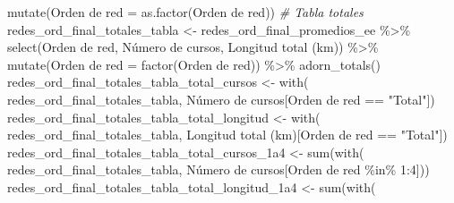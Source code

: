 \documentclass[spanish]{article}
\newenvironment{Shaded}{\begin{snugshade}}{\end{snugshade}}
\newcommand{\AttributeTok}[1]{\textcolor[rgb]{0.77,0.63,0.00}{#1}}
\newcommand{\CommentTok}[1]{\textcolor[rgb]{0.56,0.35,0.01}{\textit{#1}}}
\newcommand{\DecValTok}[1]{\textcolor[rgb]{0.00,0.00,0.81}{#1}}
\newcommand{\FunctionTok}[1]{\textcolor[rgb]{0.00,0.00,0.00}{#1}}
\newcommand{\NormalTok}[1]{#1}
\newcommand{\OtherTok}[1]{\textcolor[rgb]{0.56,0.35,0.01}{#1}}
\newcommand{\SpecialCharTok}[1]{\textcolor[rgb]{0.00,0.00,0.00}{#1}}
\newcommand{\StringTok}[1]{\textcolor[rgb]{0.31,0.60,0.02}{#1}}
\begin{document}
\begin{Shaded}
\begin{Highlighting}[]
  \FunctionTok{mutate}\NormalTok{(}\StringTok{\textasciigrave{}}\AttributeTok{Orden de red}\StringTok{\textasciigrave{}} \OtherTok{=} \FunctionTok{as.factor}\NormalTok{(}\StringTok{\textasciigrave{}}\AttributeTok{Orden de red}\StringTok{\textasciigrave{}}\NormalTok{))}
\CommentTok{\# Tabla totales}
\NormalTok{redes\_ord\_final\_totales\_tabla }\OtherTok{\textless{}{-}}\NormalTok{ redes\_ord\_final\_promedios\_ee }\SpecialCharTok{\%\textgreater{}\%} 
  \FunctionTok{select}\NormalTok{(}\StringTok{\textasciigrave{}}\AttributeTok{Orden de red}\StringTok{\textasciigrave{}}\NormalTok{, }\StringTok{\textasciigrave{}}\AttributeTok{Número de cursos}\StringTok{\textasciigrave{}}\NormalTok{,}
         \StringTok{\textasciigrave{}}\AttributeTok{Longitud total (km)}\StringTok{\textasciigrave{}}\NormalTok{) }\SpecialCharTok{\%\textgreater{}\%} 
  \FunctionTok{mutate}\NormalTok{(}\StringTok{\textasciigrave{}}\AttributeTok{Orden de red}\StringTok{\textasciigrave{}} \OtherTok{=} \FunctionTok{factor}\NormalTok{(}\StringTok{\textasciigrave{}}\AttributeTok{Orden de red}\StringTok{\textasciigrave{}}\NormalTok{)) }\SpecialCharTok{\%\textgreater{}\%} 
  \FunctionTok{adorn\_totals}\NormalTok{()}
\NormalTok{redes\_ord\_final\_totales\_tabla\_total\_cursos }\OtherTok{\textless{}{-}} \FunctionTok{with}\NormalTok{(}
\NormalTok{  redes\_ord\_final\_totales\_tabla,}
     \StringTok{\textasciigrave{}}\AttributeTok{Número de cursos}\StringTok{\textasciigrave{}}\NormalTok{[}\StringTok{\textasciigrave{}}\AttributeTok{Orden de red}\StringTok{\textasciigrave{}} \SpecialCharTok{==} \StringTok{"Total"}\NormalTok{])}
\NormalTok{redes\_ord\_final\_totales\_tabla\_total\_longitud }\OtherTok{\textless{}{-}} \FunctionTok{with}\NormalTok{(}
\NormalTok{  redes\_ord\_final\_totales\_tabla,}
     \StringTok{\textasciigrave{}}\AttributeTok{Longitud total (km)}\StringTok{\textasciigrave{}}\NormalTok{[}\StringTok{\textasciigrave{}}\AttributeTok{Orden de red}\StringTok{\textasciigrave{}} \SpecialCharTok{==} \StringTok{"Total"}\NormalTok{])}
\NormalTok{redes\_ord\_final\_totales\_tabla\_total\_cursos\_1a4 }\OtherTok{\textless{}{-}} \FunctionTok{sum}\NormalTok{(}\FunctionTok{with}\NormalTok{(}
\NormalTok{  redes\_ord\_final\_totales\_tabla,}
     \StringTok{\textasciigrave{}}\AttributeTok{Número de cursos}\StringTok{\textasciigrave{}}\NormalTok{[}\StringTok{\textasciigrave{}}\AttributeTok{Orden de red}\StringTok{\textasciigrave{}} \SpecialCharTok{\%in\%} \DecValTok{1}\SpecialCharTok{:}\DecValTok{4}\NormalTok{]))}
\NormalTok{redes\_ord\_final\_totales\_tabla\_total\_longitud\_1a4 }\OtherTok{\textless{}{-}} \FunctionTok{sum}\NormalTok{(}\FunctionTok{with}\NormalTok{(}

\end{Highlighting}
\end{Shaded}
\end{document}
